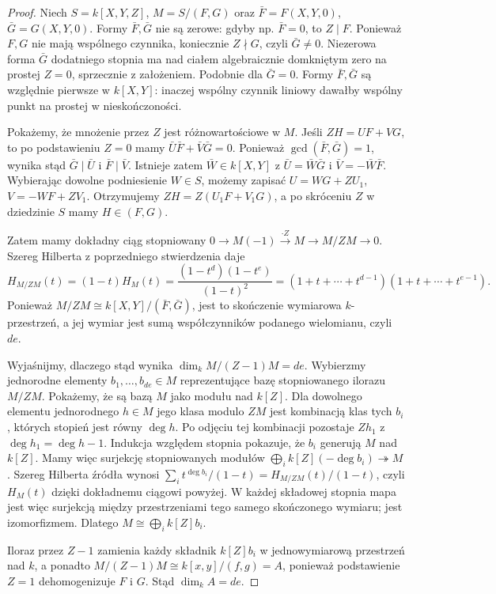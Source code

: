 \documentclass[11pt,a4paper,openany]{report}
\numberwithin{equation}{section}
\theoremstyle{plain}
\theoremstyle{definition}
\theoremstyle{remark}
\begin{document}
\begin{proof}
Niech $S=k[X,Y,Z]$, $M=S/(F,G)$ oraz
$\bar F=F(X,Y,0)$, $\bar G=G(X,Y,0)$.
Formy $\bar F,\bar G$ nie są zerowe: gdyby np.
$\bar F=0$, to $Z\mid F$. Ponieważ $F,G$ nie mają
wspólnego czynnika, koniecznie $Z\nmid G$,
czyli $\bar G\ne0$. Niezerowa forma $\bar G$
dodatniego stopnia ma nad ciałem algebraicznie
domkniętym zero na prostej $Z=0$, sprzecznie
z założeniem. Podobnie dla $\bar G=0$. Formy
$\bar F,\bar G$ są względnie pierwsze w $k[X,Y]$:
inaczej wspólny czynnik liniowy dawałby wspólny punkt
na prostej w nieskończoności.

Pokażemy, że mnożenie przez $Z$ jest różnowartościowe
w $M$. Jeśli $ZH=UF+VG$, to po podstawieniu $Z=0$
mamy $\bar U\bar F+\bar V\bar G=0$.
Ponieważ $\gcd(\bar F,\bar G)=1$, wynika stąd
$\bar G\mid\bar U$ i $\bar F\mid\bar V$.
Istnieje zatem $\bar W\in k[X,Y]$ z
$\bar U=\bar W\bar G$ i $\bar V=-\bar W\bar F$.
Wybierając dowolne podniesienie $W\in S$, możemy zapisać
$U=WG+ZU_1$, $V=-WF+ZV_1$. Otrzymujemy
$ZH=Z(U_1F+V_1G)$, a po skróceniu $Z$
w dziedzinie $S$ mamy $H\in(F,G)$.

Zatem mamy dokładny ciąg stopniowany
$0\to M(-1)\xrightarrow{\cdot Z}M\to M/ZM\to0$.
Szereg Hilberta z poprzedniego stwierdzenia daje
\[
 H_{M/ZM}(t)=(1-t)H_M(t)
 =\frac{(1-t^d)(1-t^e)}{(1-t)^2}
 =(1+t+\cdots+t^{d-1})(1+t+\cdots+t^{e-1}).
\]
Ponieważ $M/ZM\cong k[X,Y]/(\bar F,\bar G)$,
jest to skończenie wymiarowa $k$-przestrzeń, a jej
wymiar jest sumą współczynników podanego wielomianu,
czyli $de$.

Wyjaśnijmy, dlaczego stąd wynika $\dim_kM/(Z-1)M=de$.
Wybierzmy jednorodne elementy $b_1,\ldots,b_{de}\in M$
reprezentujące bazę stopniowanego ilorazu $M/ZM$.
Pokażemy, że są bazą $M$ jako modułu nad $k[Z]$.
Dla dowolnego elementu jednorodnego $h\in M$ jego klasa
modulo $ZM$ jest kombinacją klas tych $b_i$, których
stopień jest równy $\deg h$. Po odjęciu tej kombinacji
pozostaje $Zh_1$ z $\deg h_1=\deg h-1$.
Indukcja względem stopnia pokazuje, że $b_i$ generują $M$
nad $k[Z]$. Mamy więc surjekcję stopniowanych modułów
$\bigoplus_i k[Z](-\deg b_i)\twoheadrightarrow M$.
Szereg Hilberta źródła wynosi
$\sum_i t^{\deg b_i}/(1-t)=H_{M/ZM}(t)/(1-t)$,
czyli $H_M(t)$ dzięki dokładnemu ciągowi powyżej.
W każdej składowej stopnia mapa jest więc surjekcją
między przestrzeniami tego samego skończonego wymiaru;
jest izomorfizmem. Dlatego $M\cong\bigoplus_i k[Z]b_i$.

Iloraz przez $Z-1$ zamienia każdy składnik $k[Z]b_i$
w jednowymiarową przestrzeń nad $k$, a ponadto
$M/(Z-1)M\cong k[x,y]/(f,g)=A$, ponieważ podstawienie
$Z=1$ dehomogenizuje $F$ i $G$. Stąd $\dim_kA=de$.
\end{proof}
\end{document}
